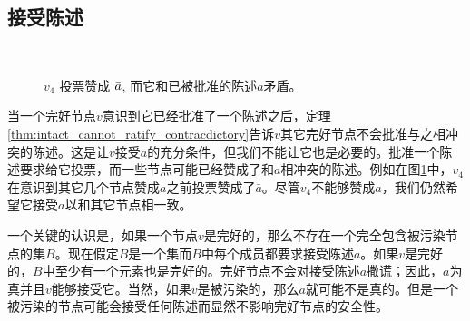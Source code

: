 \subsection{接受陈述}

\begin{figure}
\centering
{}\\
\caption{$v_4$ 投票赞成 $\bar a$, 而它和已被批准的陈述$a$矛盾。}
\label{fig:wrongvote}
\end{figure}

当一个完好节点$v$意识到它已经批准了一个陈述之后，定理\ref{thm:intact_cannot_ratify_contracdictory}告诉$v$其它完好节点不会批准与之相冲突的陈述。这是让$v$接受$a$的充分条件，但我们不能让它也是必要的。批准一个陈述要求给它投票，而一些节点可能已经赞成了和$a$相冲突的陈述。例如在图\ref{fig:wrongvote}中，$v_4$在意识到其它几个节点赞成$a$之前投票赞成了$\bar a$。尽管$v_4$不能够赞成$a$，我们仍然希望它接受$a$以和其它节点相一致。

一个关键的认识是，如果一个节点$v$是完好的，那么不存在一个完全包含被污染节点的{\vblock}集$B$。现在假定$B$是一个{\vblock}集而$B$中每个成员都要求接受陈述$a$。如果$v$是完好的，$B$中至少有一个元素也是完好的。完好节点不会对接受陈述$a$撒谎；因此，$a$为真并且$v$能够接受它。当然，如果$v$是被污染的，那么$a$就可能不是真的。但是一个被污染的节点可能会接受任何陈述而显然不影响完好节点的安全性。

